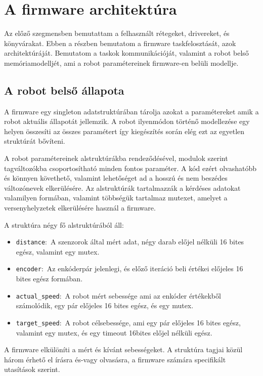 \section{A firmware architektúra}

Az előző szegmensben bemutattam a felhasznált rétegeket, drivereket, és
könyvárakat. Ebben a részben bemutatom a firmware taskfelosztását, azok
architektúráját. Bemutatom a taskok kommunikációját, valamint a robot belső
memóriamodelljét, ami a robot paramétereinek firmware-en belüli modellje. 

\subsection{A robot belső állapota}

A firmware egy singleton adatstruktúrában tárolja azokat a paramétereket amik a
robot aktuális állapotát jellemzik. A robot ilyenmódon történő modellezése egy
helyen összesíti az összes paramétert így kiegészítés során elég ezt az egyetlen
struktúrát bővíteni.

A robot paramétereinek alstruktúrákba rendeződésével, modulok szerint
tagváltozókba csoportosítható minden fontos paraméter. A kód ezért olvashatóbb és
könnyen követhető, valamint lehetőséget ad a hosszú és nem beszédes változónevek
elkerülésére. Az alstruktúrák tartalmazzák a kérdéses adatokat valamilyen
formában, valamint többségük tartalmaz mutexet, amelyet a versenyhelyzetek
elkerülésére használ a firmware.

A struktúra négy fő alstruktúrából áll:
\begin{itemize}
  \setlength\itemsep{0em}
\item{\verb|distance|:~A szenzorok által mért adat, négy darab előjel nélküli 16
  bites egész, valamint egy mutex.}
\item{\verb|encoder|:~Az enkóderpár jelenlegi, és előző iteráció beli értékei
  előjeles 16 bites egész formában.}
\item{\verb|actual_speed|:~A robot mért sebessége ami az enkóder értékekből
  számolódik, egy pár előjeles 16 bites egész, és egy mutex.}
\item{\verb|target_speed|:~A robot célsebessége, ami egy pár előjeles 16 bites
  egész, valamint egy mutex, és egy timeout 16bites előjel nélküli egész.}
\end{itemize}

A firmware elkülöníti a mért és kívánt sebességeket. A struktúra tagjai
közül három érhető el írásra és-vagy olvasásra, a firmware számára specifikált
utasítások szerint.

